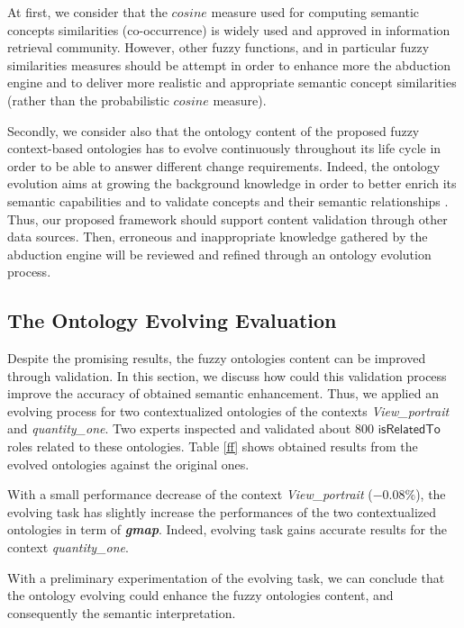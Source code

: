 At first, we consider that the $cosine$ measure used for computing semantic concepts similarities (co-occurrence) is widely used and approved in information retrieval community. However, other fuzzy functions, and in particular fuzzy similarities measures 
\citep{Baccour2011,Baccour2013,Baccour2014} should be attempt in order to enhance more the abduction engine and to deliver more realistic and  appropriate semantic concept similarities (rather than the probabilistic $cosine$  measure).

Secondly, we consider also that the ontology content of the proposed fuzzy context-based ontologies has to evolve continuously throughout
 its life cycle in order to be able  to answer different change requirements. Indeed, the ontology evolution aims at growing the background knowledge in order to better
 enrich its semantic capabilities and to validate concepts and their semantic relationships \citep{Gargouri2010}. Thus, our proposed framework should support content validation through other data sources. Then, erroneous and inappropriate knowledge gathered by the abduction engine will be  reviewed and refined through an ontology evolution process.


	\subsection{The Ontology Evolving Evaluation}
		Despite the promising results, the fuzzy ontologies content can 
		be improved through  validation. 
		In this section, we discuss how could this validation process improve 
		the accuracy of obtained semantic enhancement. 
		Thus, we applied an evolving process for two contextualized ontologies of the contexts 
		\emph{View\_portrait} and \emph{quantity\_one}. 
		Two experts inspected and validated about 800 $\mathsf{isRelatedTo}$ roles related to these ontologies. 
		Table \ref{ff} shows obtained results from the evolved ontologies against the original 
		ones. 

		With a small performance decrease of the context \emph{View\_portrait} ($-0.08\%$), 
		the evolving task has slightly increase 
		the performances of the two contextualized ontologies in term of \textit{\textbf{gmap}}.
		Indeed,  evolving task gains accurate results for the context \emph{quantity\_one}.
		
		With a preliminary experimentation of the evolving task, we can conclude that 
		the ontology evolving could enhance the fuzzy ontologies content, and consequently the semantic interpretation.
		
